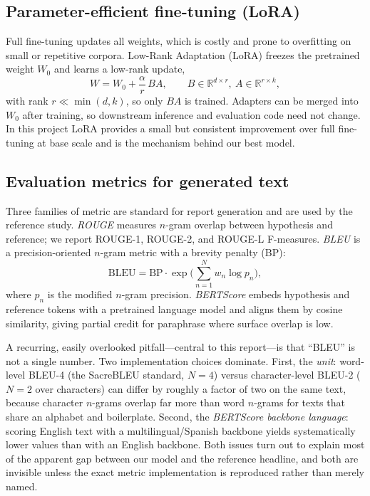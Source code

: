 \documentclass[11pt,twocolumn]{article}
\begin{document}
\subsection{Parameter-efficient fine-tuning (LoRA)}
Full fine-tuning updates all weights, which is costly and prone to overfitting on small or
repetitive corpora. Low-Rank Adaptation (LoRA) freezes the pretrained weight $W_0$ and learns a
low-rank update,
\begin{equation}
W = W_0 + \frac{\alpha}{r}\, B A,\qquad B\in\mathbb{R}^{d\times r},\ A\in\mathbb{R}^{r\times k},
\end{equation}
with rank $r \ll \min(d,k)$, so only $BA$ is trained. Adapters can be merged into $W_0$ after
training, so downstream inference and evaluation code need not change. In this project LoRA
provides a small but consistent improvement over full fine-tuning at base scale and is the
mechanism behind our best model.

\subsection{Evaluation metrics for generated text}
\label{sec:metrics-bg}
Three families of metric are standard for report generation and are used by the reference study.
\emph{ROUGE} measures $n$-gram overlap between hypothesis and reference; we report ROUGE-1,
ROUGE-2, and ROUGE-L F-measures. \emph{BLEU} is a precision-oriented $n$-gram metric with a
brevity penalty (BP):
\begin{equation}
\mathrm{BLEU} = \mathrm{BP}\cdot\exp\!\Big(\textstyle\sum_{n=1}^{N} w_n \log p_n\Big),
\end{equation}
where $p_n$ is the modified $n$-gram precision. \emph{BERTScore} embeds hypothesis and reference
tokens with a pretrained language model and aligns them by cosine similarity, giving partial
credit for paraphrase where surface overlap is low.

A recurring, easily overlooked pitfall---central to this report---is that ``BLEU'' is not a
single number. Two implementation choices dominate. First, the \emph{unit}: word-level BLEU-4
(the SacreBLEU standard, $N{=}4$) versus character-level BLEU-2 ($N{=}2$ over characters) can
differ by roughly a factor of two on the same text, because character $n$-grams overlap far more
than word $n$-grams for texts that share an alphabet and boilerplate. Second, the \emph{BERTScore
backbone language}: scoring English text with a multilingual/Spanish backbone yields
systematically lower values than with an English backbone. Both issues turn out to explain most
of the apparent gap between our model and the reference headline, and both are invisible unless
the exact metric implementation is reproduced rather than merely named.
\end{document}
